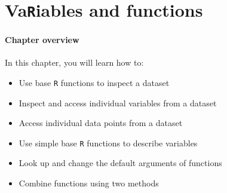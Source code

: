\documentclass[
  letterpaper,
  DIV=11,
  numbers=noendperiod]{scrreprt}
\providecommand{\tightlist}{%
  \setlength{\itemsep}{0pt}\setlength{\parskip}{0pt}}
\begin{document}

\chapter{\texorpdfstring{Va\texttt{R}iables and
functions}{VaRiables and functions}}\label{sec-VaRiablesAndFunctions}

\subsubsection*{\texorpdfstring{\textbf{Chapter
overview}}{Chapter overview}}\label{chapter-overview-6}

In this chapter, you will learn how to:

\begin{itemize}
\tightlist
\item
  Use base \texttt{R} functions to inspect a dataset
\item
  Inspect and access individual variables from a dataset
\item
  Access individual data points from a dataset
\item
  Use simple base \texttt{R} functions to describe variables
\item
  Look up and change the default arguments of functions
\item
  Combine functions using two methods
\end{itemize}
\end{document}
